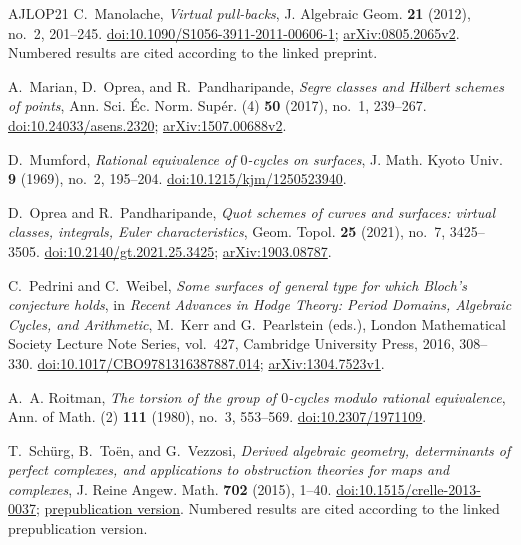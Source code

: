\begin{thebibliography}{AJLOP21}
C.~Manolache, \emph{Virtual pull-backs},
J. Algebraic Geom. \textbf{21} (2012), no.~2, 201--245.
\href{https://doi.org/10.1090/S1056-3911-2011-00606-1}{doi:10.1090/S1056-3911-2011-00606-1};
\href{https://arxiv.org/abs/0805.2065v2}{arXiv:0805.2065v2}.
Numbered results are cited according to the linked preprint.

A.~Marian, D.~Oprea, and R.~Pandharipande,
\emph{Segre classes and Hilbert schemes of points},
Ann. Sci. \'Ec. Norm. Sup\'er. (4) \textbf{50} (2017), no.~1, 239--267.
\href{https://doi.org/10.24033/asens.2320}{doi:10.24033/asens.2320};
\href{https://arxiv.org/abs/1507.00688v2}{arXiv:1507.00688v2}.

D.~Mumford, \emph{Rational equivalence of $0$-cycles on surfaces},
J. Math. Kyoto Univ. \textbf{9} (1969), no.~2, 195--204.
\href{https://doi.org/10.1215/kjm/1250523940}{doi:10.1215/kjm/1250523940}.

D.~Oprea and R.~Pandharipande,
\emph{Quot schemes of curves and surfaces: virtual classes, integrals, Euler characteristics},
Geom. Topol. \textbf{25} (2021), no.~7, 3425--3505.
\href{https://doi.org/10.2140/gt.2021.25.3425}{doi:10.2140/gt.2021.25.3425};
\href{https://arxiv.org/abs/1903.08787}{arXiv:1903.08787}.

C.~Pedrini and C.~Weibel,
\emph{Some surfaces of general type for which Bloch's conjecture holds},
in \emph{Recent Advances in Hodge Theory: Period Domains, Algebraic Cycles,
and Arithmetic}, M.~Kerr and G.~Pearlstein (eds.),
London Mathematical Society Lecture Note Series, vol.~427,
Cambridge University Press, 2016, 308--330.
\href{https://doi.org/10.1017/CBO9781316387887.014}{doi:10.1017/CBO9781316387887.014};
\href{https://arxiv.org/abs/1304.7523v1}{arXiv:1304.7523v1}.

A.~A. Roitman,
\emph{The torsion of the group of $0$-cycles modulo rational equivalence},
Ann. of Math. (2) \textbf{111} (1980), no.~3, 553--569.
\href{https://doi.org/10.2307/1971109}{doi:10.2307/1971109}.

T.~Sch\"urg, B.~To\"en, and G.~Vezzosi,
\emph{Derived algebraic geometry, determinants of perfect complexes,
and applications to obstruction theories for maps and complexes},
J. Reine Angew. Math. \textbf{702} (2015), 1--40.
\href{https://doi.org/10.1515/crelle-2013-0037}{doi:10.1515/crelle-2013-0037};
\href{https://flore.unifi.it/bitstream/2158/800683/1/crelle.pdf}{prepublication version}.
Numbered results are cited according to the linked prepublication version.


\end{thebibliography}
